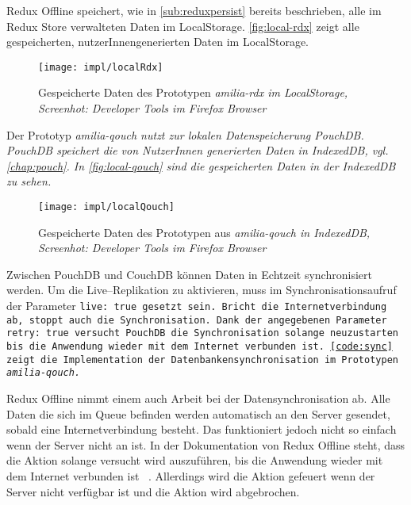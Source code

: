%
%
Redux Offline speichert, wie in \autoref{sub:reduxpersist} bereits beschrieben, alle im Redux Store verwalteten Daten im LocalStorage. \autoref{fig:local-rdx} zeigt alle gespeicherten, nutzerInnengenerierten Daten im LocalStorage.
%
\begin{figure}[H]
  \centering
  \texttt{[image: impl/localRdx]}
  \grayRule
  \caption[Gespeicherte Daten im LocalStorage]{Gespeicherte Daten des Prototypen \it{amilia-rdx} im LocalStorage,\\Screenhot: Developer Tools im Firefox Browser}
  \label{fig:local-rdx}
\end{figure}
% 
Der Prototyp \it{amilia-qouch} nutzt zur lokalen Datenspeicherung PouchDB. PouchDB speichert die von NutzerInnen generierten Daten in IndexedDB, vgl. \autoref{chap:pouch}. In \autoref{fig:local-qouch} sind die gespeicherten Daten in der IndexedDB zu sehen.
%
\begin{figure}[H]
  \centering
  \texttt{[image: impl/localQouch]}
  \grayRule
  \caption[Gespeicherte Daten in IndexedDB]{Gespeicherte Daten des Prototypen aus \it{amilia-qouch} in IndexedDB,\\Screenhot: Developer Tools im Firefox Browser}
  \label{fig:local-qouch}
\end{figure}
%
%
Zwischen PouchDB und CouchDB können Daten in Echtzeit synchronisiert werden. Um die Live--Replikation zu aktivieren, muss im Synchronisationsaufruf der Parameter \tt{live: true} gesetzt sein.
Bricht die Internetverbindung ab, stoppt auch die Synchronisation.
Dank der angegebenen Parameter \tt{retry: true} versucht PouchDB die Synchronisation solange neuzustarten bis die Anwendung wieder mit dem Internet verbunden ist. \autoref{code:sync} zeigt die Implementation der Datenbankensynchronisation im Prototypen \it{amilia-qouch}.
%
\begin{center}
  
\end{center}
Redux Offline nimmt einem auch Arbeit bei der Datensynchronisation ab. Alle Daten die sich im Queue befinden werden automatisch an den Server gesendet, sobald eine Internetverbindung besteht. Das funktioniert jedoch nicht so einfach wenn der Server nicht an ist. In der Dokumentation von Redux Offline steht, dass die Aktion solange versucht wird auszuführen, bis die Anwendung wieder mit dem Internet verbunden ist ~\cite{giving-up}. Allerdings wird die  Aktion gefeuert wenn der Server nicht verfügbar ist und die Aktion wird abgebrochen.
